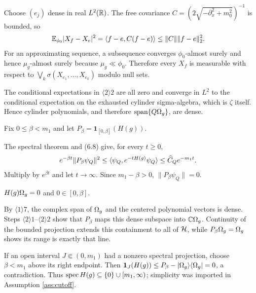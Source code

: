 \documentclass[11pt,a4paper]{article}
\begin{document}

\Because Choose $(e_j)$ dense in real $L^2(\mathbb R)$.  The free covariance
$C=(2\sqrt{-\partial_x^2+m_0^2})^{-1}$ is bounded, so
\[
 \mathbb E_{\phi_0}|X_f-X_e|^2=\langle f-e,C(f-e)\rangle\leq\|C\|\|f-e\|_2^2.
\]
For an approximating sequence, a subsequence converges $\phi_0$-almost surely and
hence $\mu_g$-almost surely because $\mu_g\ll\phi_0$.  Therefore every $X_f$ is
measurable with respect to $\bigvee_k\sigma(X_{e_1},\dots,X_{e_k})$ modulo null sets.


\Because The conditional expectations in $\langle2\rangle2$ are all zero and converge
in $L^2$ to the conditional expectation on the exhausted cylinder sigma-algebra, which
is $\zeta$ itself.  Hence cylinder polynomials, and therefore
$\operatorname{span}\{Q\Omega_g\}$, are dense.

\QedStep


Fix $0\leq\beta<m_1$ and let $P_\beta=\mathbf1_{[0,\beta]}(H(g))$.


\Because The spectral theorem and (6.8) give, for every $t\geq0$,
\[
 e^{-\beta t}\|P_\beta\psi_Q\|^2
 \leq\langle \psi_Q,e^{-tH(g)}\psi_Q\rangle
 \leq\widehat C_Qe^{-m_1t}.
\]
Multiply by $e^{\beta t}$ and let $t\to\infty$.  Since $m_1-\beta>0$,
$\|P_\beta\psi_Q\|=0$.


\Because $H(g)\Omega_g=0$ and $0\in[0,\beta]$.


\Because By $\langle1\rangle7$, the complex span of $\Omega_g$ and the centered
polynomial vectors is dense.  Steps $\langle2\rangle1$--$\langle2\rangle2$ show that
$P_\beta$ maps this dense subspace into $\mathbb C\Omega_g$.  Continuity of the bounded
projection extends this containment to all of $\mathcal H$, while
$P_\beta\Omega_g=\Omega_g$ shows its range is exactly that line.


\Because If an open interval $J\Subset(0,m_1)$ had a nonzero spectral projection,
choose $\beta<m_1$ above its right endpoint.  Then
$\mathbf1_J(H(g))\leq P_\beta-|\Omega_g\rangle\langle\Omega_g|=0$, a contradiction.
Thus $\operatorname{spec} H(g)\subseteq\{0\}\cup[m_1,\infty)$; simplicity was imported in
Assumption \ref{ass:cutoff}.
\end{document}
